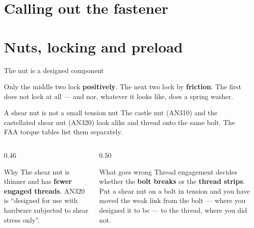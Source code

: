 \documentclass[aspectratio=169,10pt]{beamer}
\begin{document}
\section{Calling out the fastener}


\section{Nuts, locking and preload}

\begin{frame}{The nut is a designed component}
\centering
\resizebox{0.99\textwidth}{!}{}
\vfill
\raggedright
Only the middle two lock \textbf{positively}. The next two lock by \textbf{friction}. The first does
not lock at all --- and nor, whatever it looks like, does a spring washer.
\end{frame}

\begin{frame}{A shear nut is not a small tension nut}
The castle nut (AN310) and the castellated shear nut (AN320) look alike and thread onto the same
bolt. The FAA torque tables list them \alert{separately}.
\vfill
\begin{columns}[T]
\begin{column}{0.46\textwidth}
\begin{block}{Why}
The shear nut is thinner and has \textbf{fewer engaged threads}. AN320 is ``designed for use with
hardware subjected to shear stress only''.
\end{block}
\end{column}
\begin{column}{0.50\textwidth}
\begin{alertblock}{What goes wrong}
Thread engagement decides whether the \textbf{bolt breaks} or the \textbf{thread strips}.
\vspace{2pt}
Put a shear nut on a bolt in tension and you have moved the weak link from the bolt --- where you
designed it to be --- to the thread, where you did not.
\end{alertblock}
\end{column}
\end{columns}
\end{frame}
\end{document}
